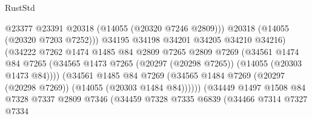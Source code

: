 \begin{lexlean}{RustStd}
\begin{coremodule}
                                          @23377
                                          @23391
                                          @20318
                                          (@14055 (@20320 @7246 @2809)))
                                        @20318
                                        (@14055 (@20320 @7203 @7252)))
                                      @34195
                                      @34198
                                      @34201
                                      @34205
                                      @34210
                                      @34216)
                                    (@34222
                                      @7262
                                      @1474
                                      @1485
                                      @84
                                      @2809
                                      @7265
                                      @2809
                                      @7269
                                      (@34561
                                        @1474
                                        @84
                                        @7265
                                        (@34565
                                          @1473
                                          @7265
                                          (@20297 (@20298 @7265))
                                          (@14055 (@20303 @1473 @84))))
                                      (@34561
                                        @1485
                                        @84
                                        @7269
                                        (@34565
                                          @1484
                                          @7269
                                          (@20297 (@20298 @7269))
                                          (@14055 (@20303 @1484 @84))))))
                                  (@34449
                                    @1497
                                    @1508
                                    @84
                                    @7328
                                    @7337
                                    @2809
                                    @7346
                                    (@34459
                                      @7328
                                      @7335
                                      @6839
                                      (@34466
                                        @7314
                                        @7327
                                        @7334

\end{coremodule}
\end{lexlean}
